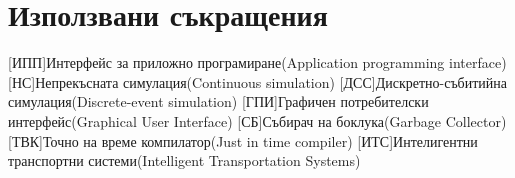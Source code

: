\appendix
\chapter{Използвани съкращения}
	\begin{acronym}[JDK]
		[ИПП]{Интерфейс за приложно програмиране(Application programming interface)}
		[НС]{Непрекъсната симулация(Continuous simulation)}
		[ДСС]{Дискретно-събитийна симулация(Discrete-event simulation)}
		[ГПИ]{Графичен потребителски интерфейс(Graphical User Interface)}
		[СБ]{Събирач на боклука(Garbage Collector)}
		[ТВК]{Точно на време компилатор(Just in time compiler)}
		[ИТС]{Интелигентни транспортни системи(Intelligent Transportation Systems)}
	\end{acronym}